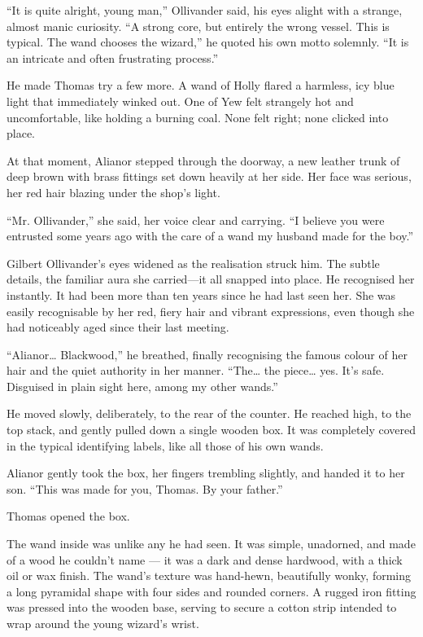 \enquote{It is quite alright, young man,} Ollivander said, his eyes alight with a strange, almost manic curiosity. \enquote{A strong core, but entirely the wrong vessel. This is typical. The wand chooses the wizard,} he quoted his own motto solemnly. \enquote{It is an intricate and often frustrating process.}

He made Thomas try a few more. A wand of Holly flared a harmless, icy blue light that immediately winked out. One of Yew felt strangely hot and uncomfortable, like holding a burning coal. None felt right; none clicked into place.

At that moment, Alianor stepped through the doorway, a new leather trunk of deep brown with brass fittings set down heavily at her side. Her face was serious, her red hair blazing under the shop's light.

\enquote{Mr. Ollivander,} she said, her voice clear and carrying. \enquote{I believe you were entrusted some years ago with the care of a wand my husband made for the boy.}

Gilbert Ollivander's eyes widened as the realisation struck him. The subtle details, the familiar aura she carried---it all snapped into place. He recognised her instantly. It had been more than ten years since he had last seen her. She was easily recognisable by her red, fiery hair and vibrant expressions, even though she had noticeably aged since their last meeting.

\enquote{Alianor\ldots{} Blackwood,} he breathed, finally recognising the famous colour of her hair and the quiet authority in her manner. \enquote{The\ldots{} the piece\ldots{} yes. It's safe. Disguised in plain sight here, among my other wands.}

He moved slowly, deliberately, to the rear of the counter. He reached high, to the top stack, and gently pulled down a single wooden box. It was completely covered in the typical identifying labels, like all those of his own wands.

Alianor gently took the box, her fingers trembling slightly, and handed it to her son. \enquote{This was made for you, Thomas. By your father.}

Thomas opened the box.

The wand inside was unlike any he had seen. It was simple, unadorned, and made of a wood he couldn't name --- it was a dark and dense hardwood, with a thick oil or wax finish. The wand's texture was hand-hewn, beautifully wonky, forming a long pyramidal shape with four sides and rounded corners. A rugged iron fitting was pressed into the wooden base, serving to secure a cotton strip intended to wrap around the young wizard's wrist.

